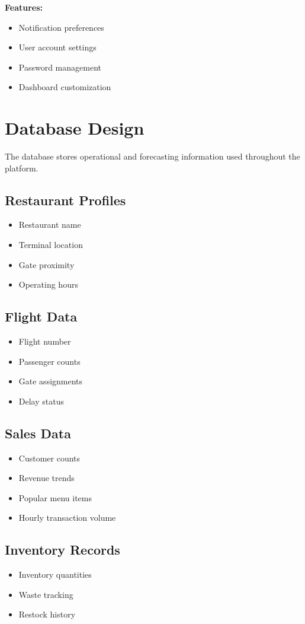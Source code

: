 \documentclass[12pt]{article}
\begin{document}
\textbf{Features:}
\begin{itemize}
\item Notification preferences
\item User account settings
\item Password management
\item Dashboard customization
\end{itemize}

\section{Database Design}

The database stores operational and forecasting information used throughout the platform.

\subsection{Restaurant Profiles}
\begin{itemize}
\item Restaurant name
\item Terminal location
\item Gate proximity
\item Operating hours
\end{itemize}

\subsection{Flight Data}
\begin{itemize}
\item Flight number
\item Passenger counts
\item Gate assignments
\item Delay status
\end{itemize}

\subsection{Sales Data}
\begin{itemize}
\item Customer counts
\item Revenue trends
\item Popular menu items
\item Hourly transaction volume
\end{itemize}

\subsection{Inventory Records}
\begin{itemize}
\item Inventory quantities
\item Waste tracking
\item Restock history
\end{itemize}
\end{document}
